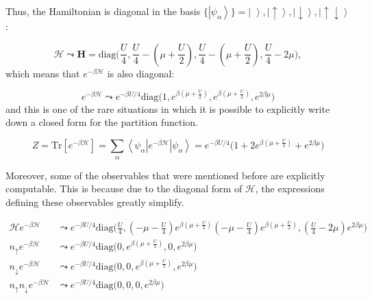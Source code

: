 Thus, the Hamiltonian is diagonal in the basis $\{\left| \psi_\alpha \right\rangle \} = \left| \,\, \right\rangle, \left|\uparrow \right\rangle, \left|\downarrow\right \rangle, \left|\uparrow \downarrow \right\rangle $:

\begin{equation}
\mathcal{H} \leadsto \bm H = \text{diag}\bigg(\frac{U}{4}, \frac{U}{4} - (\mu + \frac{U}{2} ), \frac{U}{4} - (\mu + \frac{U}{2} ), \frac{U}{4} - 2 \mu \bigg) ,
\end{equation}
which means that $e^{-\beta \mathcal{H} }$ is also diagonal:

\begin{equation}
e^{-\beta \mathcal{H} } \leadsto e^{-\beta U / 4}  \text{diag}\bigg(1,  e^{\beta(\mu + \frac{U}{2})}, e^{\beta(\mu + \frac{U}{2})},  e^{2\beta \mu} \bigg)
\end{equation}
and this is one of the rare situations in which it is possible to explicitly write down a closed form for the partition function.

\begin{equation}\label{eq:singleSitePartition}
Z = \text{Tr} [ e^{-\beta\mathcal{H} } ] = \sum_\alpha \left\langle \psi_\alpha \left|e^{-\beta \mathcal{H} } \right| \psi_\alpha \right\rangle = e^{-\beta U / 4} \bigg(1 + 2 e^{\beta(\mu + \frac{U}{2})} + e^{2 \beta \mu} \bigg)
\end{equation}

Moreover, some of the observables that were mentioned before are explicitly computable.
This is because due to the diagonal form of $\mathcal{H}$, the expressions defining these observables greatly simplify.

\begin{equation}
\begin{split}
\mathcal{H} e^{-\beta\mathcal{H} } &\leadsto e^{-\beta U / 4}  \text{diag}\bigg(\frac{U}{4}, (-\mu - \frac{U}{4})  e^{\beta(\mu + \frac{U}{2})} (-\mu - \frac{U}{4}) e^{\beta(\mu + \frac{U}{2})}, (\frac{U}{4} - 2\mu ) e^{2\beta \mu} \bigg) \\
n_{\uparrow} e^{-\beta\mathcal{H} } &\leadsto e^{-\beta U / 4}  \text{diag}\bigg(0, e^{\beta(\mu + \frac{U}{2})}, 0,  e^{2\beta \mu} \bigg) \\
n_{\downarrow} e^{-\beta\mathcal{H} } &\leadsto e^{-\beta U / 4}  \text{diag}\bigg(0, 0, e^{\beta(\mu + \frac{U}{2})},   e^{2\beta \mu} \bigg) \\
n_{\uparrow} n_{\downarrow} e^{-\beta\mathcal{H} } &\leadsto e^{-\beta U / 4}  \text{diag}\bigg(0, 0, 0,   e^{2\beta \mu} \bigg) \\
\end{split}
\end{equation}

